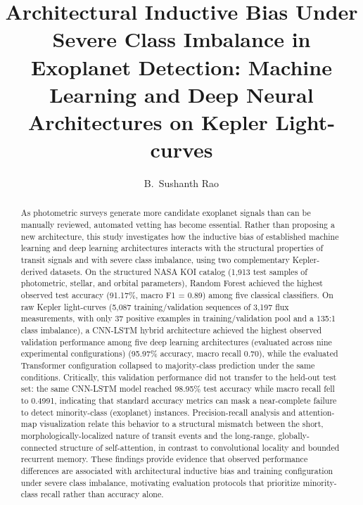 \documentclass[preprint,11pt,times]{elsarticle}
\begin{document}
\begin{frontmatter}

\title{Architectural Inductive Bias Under Severe Class Imbalance in Exoplanet Detection: Machine Learning and Deep Neural Architectures on Kepler Light-curves}

\author[first]{B.~Sushanth Rao}



\begin{abstract}
As photometric surveys generate more candidate exoplanet signals than can be manually reviewed, automated vetting has become essential. Rather than proposing a new architecture, this study investigates how the inductive bias of established machine learning and deep learning architectures interacts with the structural properties of transit signals and with severe class imbalance, using two complementary Kepler-derived datasets. On the structured NASA KOI catalog (1,913 test samples of photometric, stellar, and orbital parameters), Random Forest achieved the highest observed test accuracy (91.17\%, macro F1 = 0.89) among five classical classifiers. On raw Kepler light-curves (5,087 training/validation sequences of 3,197 flux measurements, with only 37 positive examples in training/validation pool and a 135:1 class imbalance), a CNN-LSTM hybrid architecture achieved the highest observed validation performance among five deep learning architectures (evaluated across nine experimental configurations) (95.97\% accuracy, macro recall 0.70), while the evaluated Transformer configuration collapsed to majority-class prediction under the same conditions. Critically, this validation performance did not transfer to the held-out test set: the same CNN-LSTM model reached 98.95\% test accuracy while macro recall fell to 0.4991, indicating that standard accuracy metrics can mask a near-complete failure to detect minority-class (exoplanet) instances. Precision-recall analysis and attention-map visualization relate this behavior to a structural mismatch between the short, morphologically-localized nature of transit events and the long-range, globally-connected structure of self-attention, in contrast to convolutional locality and bounded recurrent memory. These findings provide evidence that observed performance differences are associated with architectural inductive bias and training configuration under severe class imbalance, motivating evaluation protocols that prioritize minority-class recall rather than accuracy alone.
\end{abstract}


\end{frontmatter}
\end{document}
